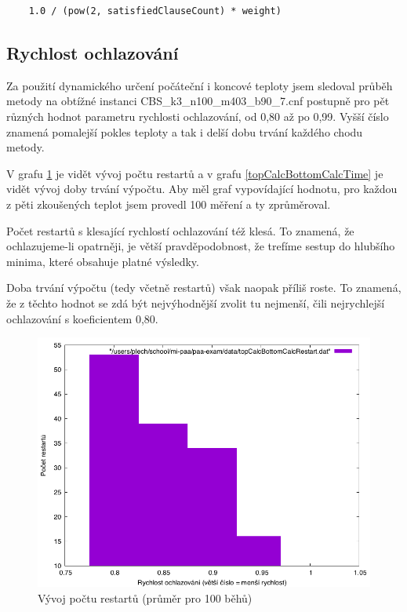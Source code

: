 \documentclass[12pt,a4paper]{article}
\begin{document}
\begin{verbatim}
    1.0 / (pow(2, satisfiedClauseCount) * weight)
\end{verbatim}






\subsection{Rychlost ochlazování}

Za použití dynamického určení počáteční i koncové teploty jsem sledoval průběh metody na obtížné instanci CBS\_k3\_n100\_m403\_b90\_7.cnf postupně pro pět různých hodnot parametru rychlosti ochlazování, od 0,80 až po 0,99. Vyšší číslo znamená pomalejší pokles teploty a tak i delší dobu trvání každého chodu metody.

V grafu \ref{topCalcBottomCalcRestart} je vidět vývoj počtu restartů a v grafu \ref{topCalcBottomCalcTime} je vidět vývoj doby trvání výpočtu. Aby měl graf vypovídající hodnotu, pro každou z pěti zkoušených teplot jsem provedl 100 měření a ty zprůměroval.

Počet restartů s klesající rychlostí ochlazování též klesá. To znamená, že ochlazujeme-li opatrněji, je větší pravděpodobnost, že trefíme sestup do hlubšího minima, které obsahuje platné výsledky.

Doba trvání výpočtu (tedy včetně restartů) však naopak příliš roste. To znamená, že z těchto hodnot se zdá být nejvýhodnější zvolit tu nejmenší, čili nejrychlejší ochlazování s koeficientem 0,80.


\begin{figure}[H]
\includegraphics[width=\textwidth]{topCalcBottomCalcRestart}
\caption{Vývoj počtu restartů (průměr pro 100 běhů)}
\label{topCalcBottomCalcRestart}
\end{figure}
\end{document}
